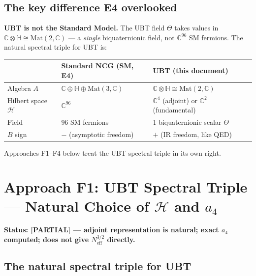 \documentclass[11pt,a4paper]{article}
\theoremstyle{definition}
\theoremstyle{remark}
\begin{document}
\subsection{The key difference E4 overlooked}

\textbf{UBT is not the Standard Model.}
The UBT field $\Theta$ takes values in $\mathbb{C}\otimes\mathbb{H} \cong
\mathrm{Mat}(2,\mathbb{C})$ — a \emph{single} biquaternionic field,
not $\mathbb{C}^{96}$ SM fermions.
The natural spectral triple for UBT is:
\begin{center}
\begin{tabular}{lll}
  \toprule
  & Standard NCG (SM, E4) & UBT (this document) \\
  \midrule
  Algebra $A$ & $\mathbb{C}\oplus\mathbb{H}\oplus\mathrm{Mat}(3,\mathbb{C})$
    & $\mathbb{C}\otimes\mathbb{H} \cong \mathrm{Mat}(2,\mathbb{C})$ \\
  Hilbert space $\mathcal{H}$ & $\mathbb{C}^{96}$
    & $\mathbb{C}^4$ (adjoint) or $\mathbb{C}^2$ (fundamental) \\
  Field & 96 SM fermions & 1 biquaternionic scalar $\Theta$ \\
  $B$ sign & $-$ (asymptotic freedom) & $+$ (IR freedom, like QED) \\
  \bottomrule
\end{tabular}
\end{center}
Approaches F1--F4 below treat the UBT spectral triple in its own right.

\section{Approach F1: UBT Spectral Triple — Natural Choice of
  $\mathcal{H}$ and $a_4$}
\label{sec:F1}

\textbf{Status: [PARTIAL] — adjoint representation is natural; exact $a_4$
computed; does not give $N_{\mathrm{eff}}^{3/2}$ directly.}

\subsection{The natural spectral triple for UBT}
\end{document}
